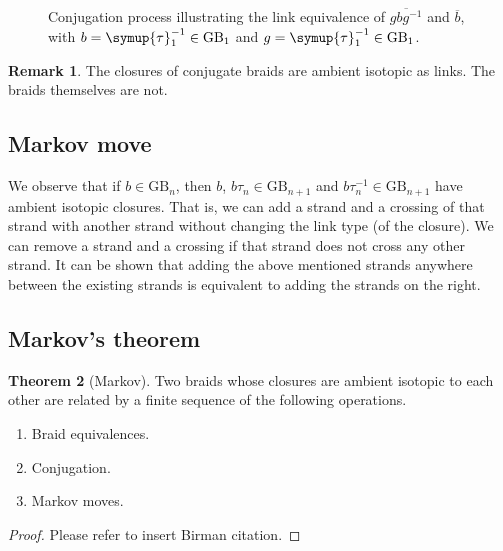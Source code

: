 \documentclass[oneside]{book}
\newcommand{\GB}{\text{GB}}
\newcommand{\tauu}{\symup{\tau}}
\theoremstyle{definition}
\newtheorem{thm}{Theorem}
\newtheorem{remark}[thm]{Remark}
\begin{document}
\begin{figure}[H]
{			}
		\caption{Conjugation process illustrating the link equivalence of \(\overline{g b g^{-1}}\) and \(\overline{b}\), with \(b = \tauu_1^{-1} \in \GB_1\) and \(g = \tauu_1^{-1} \in \GB_1\).}
		\label{fig:conjugation}
	\end{figure}

	\begin{remark}
		The closures of conjugate braids are ambient isotopic as links. The braids themselves are not.
	\end{remark}

	\subsection{Markov move}

	We observe that if \(b \in \GB_n\), then \(b\), \(b \tau_n \in \GB_{n+1}\) and \(b \tau_n^{-1} \in \GB_{n+1}\) have ambient isotopic closures. That is, we can add a strand and a crossing of that strand with another strand without changing the link type (of the closure). We can remove a strand and a crossing if that strand does not cross any other strand. It can be shown that adding the above mentioned strands anywhere between the existing strands is equivalent to adding the strands on the right.

	\subsection{Markov's theorem}

	\begin{thm}[Markov]
		Two braids whose closures are ambient isotopic to each other are related by a finite sequence of the following operations.
		\begin{enumerate}
			\item Braid equivalences.
			\item Conjugation.
			\item Markov moves.
		\end{enumerate}
	\end{thm}
	\begin{proof}
		Please refer to insert Birman citation.
	\end{proof}
\end{document}

